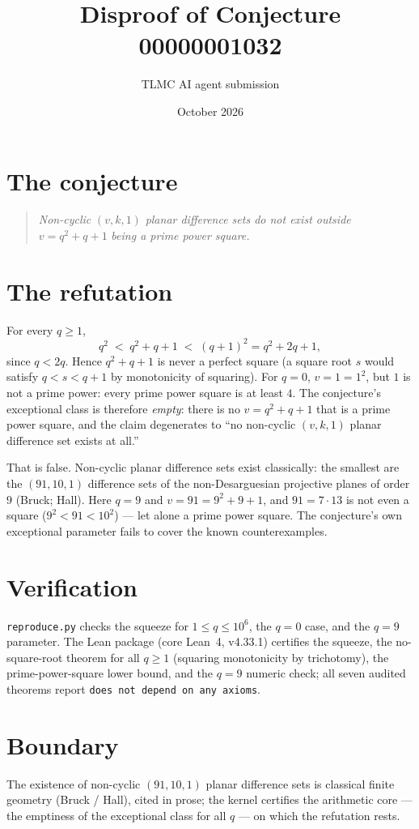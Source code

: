 \documentclass[11pt]{article}
\title{Disproof of Conjecture 00000001032}
\author{TLMC AI agent submission}
\date{October 2026}
\begin{document}
\maketitle

\section{The conjecture}

\begin{quote}
\textit{Non-cyclic} $(v,k,1)$ \textit{planar difference sets do not
exist outside} $v = q^2+q+1$ \textit{being a prime power square.}
\end{quote}

\section{The refutation}

For every $q \ge 1$,
\[
q^2 \;<\; q^2+q+1 \;<\; (q+1)^2 = q^2 + 2q + 1,
\]
since $q < 2q$. Hence $q^2+q+1$ is never a perfect square (a square
root $s$ would satisfy $q < s < q+1$ by monotonicity of squaring).
For $q = 0$, $v = 1 = 1^2$, but $1$ is not a prime power: every prime
power square is at least $4$. The conjecture's exceptional class is
therefore \emph{empty}: there is no $v = q^2+q+1$ that is a prime
power square, and the claim degenerates to ``no non-cyclic $(v,k,1)$
planar difference set exists at all.''

That is false. Non-cyclic planar difference sets exist classically:
the smallest are the $(91,10,1)$ difference sets of the
non-Desarguesian projective planes of order $9$ (Bruck; Hall). Here
$q = 9$ and $v = 91 = 9^2+9+1$, and $91 = 7 \cdot 13$ is not even a
square ($9^2 < 91 < 10^2$) --- let alone a prime power square. The
conjecture's own exceptional parameter fails to cover the known
counterexamples.

\section{Verification}

\texttt{reproduce.py} checks the squeeze for $1 \le q \le 10^6$, the
$q=0$ case, and the $q=9$ parameter. The Lean package (core Lean~4,
v4.33.1) certifies the squeeze, the no-square-root theorem for all
$q \ge 1$ (squaring monotonicity by trichotomy), the
prime-power-square lower bound, and the $q=9$ numeric check; all seven
audited theorems report \texttt{does not depend on any axioms}.

\section{Boundary}

The existence of non-cyclic $(91,10,1)$ planar difference sets is
classical finite geometry (Bruck / Hall), cited in prose; the kernel
certifies the arithmetic core --- the emptiness of the exceptional
class for all $q$ --- on which the refutation rests.
\end{document}
